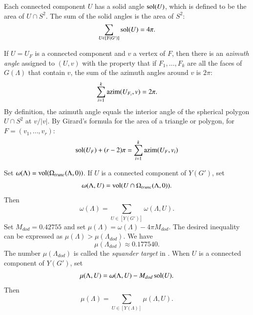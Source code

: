 \documentclass{article} %
\begin{document}


Each connected component $U$ has a solid angle $\operatorname{sol}(U)$, which
is defined to be the area of $U\cap S^2$.  The sum of the
solid angles is the area of $S^2$:
$$
\sum_{U\in[Y(G')]} \operatorname{sol}(U) = 4\pi.
$$

If $U=U_F$ is a connected component and $v$ a vertex of $F$, then there
is an {\it azimuth angle} assigned to $(U,v)$ with the property
that if $F_1,\ldots,F_k$ are all the faces of $G(\Lambda)$
that contain $v$, the sum of the azimuth angles around
$v$ is $2\pi$:
$$
\sum_{i=1}^k {\operatorname{azim}}(U_{F_i},v) = 2\pi.
$$
By definition, the azimuth angle equals the interior angle of the
spherical polygon $U\cap S^2$ at $v/|v|$. By Girard's formula for the
area of a triangle or polygon, for 
$F = (v_1,\ldots,v_r)$:
  \begin{equation}
  \operatorname{sol}(U_F) + (r-2)\pi = \sum_{i=1}^k {\operatorname{azim}}(U_F,v_i)
  \end{equation}


Set $\omega(\Lambda)={\operatorname{vol}}(\Omega_{trunc}(\Lambda,0))$.
If $U$ is a connected component of $Y(G')$, set
  $$\omega(\Lambda,U) = {\operatorname{vol}}(U\cap \Omega_{trunc}(\Lambda,0)).$$
Then
\begin{equation}\label{eqn:omegaU}
  \omega(\Lambda) = 
  \sum_{U\in[Y(G')]} \omega(\Lambda,U).
\end{equation}
Set $M_{dod}=0.42755$ and set  $\mu(\Lambda)= \omega(\Lambda)- 4\pi M_{dod}$.
The desired inequality can be expressed as
$\mu(\Lambda) > \mu(\Lambda_{dod})$.  
We have 
$$
  \mu(\Lambda_{dod}) \approx 0.177540.
$$
The number $\mu(\Lambda_{dod})$ is called the \emph{squander target}
in \cite{Hales:2002:Dodec}. When $U$ is a connected component of
$Y(G')$, set
\begin{equation}\label{eqn:mU}
  \mu(\Lambda,U)= \omega(\Lambda,U) - M_{dod} \operatorname{sol}(U).
\end{equation}
Then
$$
\mu(\Lambda) = \sum_{U\in[Y(\Lambda)]} \mu(\Lambda,U).
$$
\end{document}

